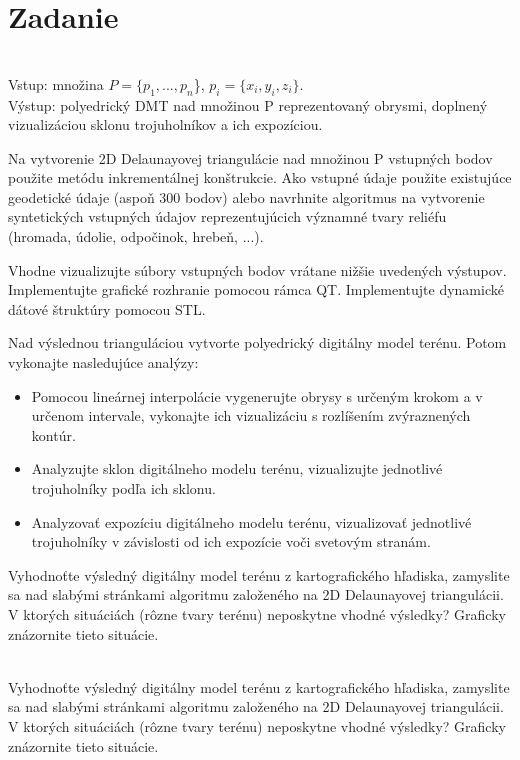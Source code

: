 \documentclass[12pt]{article}
\begin{document}
\section*{Zadanie}\\
\noindent  Vstup: množina $P = \{p_1,..., p_n $\}, $p_i = \{x_i, y_i, z_i\}$. \\
Výstup: polyedrický DMT nad množinou P reprezentovaný obrysmi, doplnený vizualizáciou sklonu trojuholníkov a ich expozíciou.\par
 Na vytvorenie 2D Delaunayovej triangulácie nad množinou P vstupných bodov použite metódu inkrementálnej konštrukcie. Ako vstupné údaje použite existujúce geodetické údaje (aspoň 300 bodov) alebo navrhnite algoritmus na vytvorenie syntetických vstupných údajov reprezentujúcich významné tvary reliéfu (hromada, údolie, odpočinok, hrebeň, ...).\par
Vhodne vizualizujte súbory vstupných bodov vrátane nižšie uvedených výstupov. Implementujte grafické rozhranie pomocou rámca QT. Implementujte dynamické dátové štruktúry pomocou STL.\par
Nad výslednou trianguláciou vytvorte polyedrický digitálny model terénu. Potom vykonajte nasledujúce analýzy:
\begin{itemize}
    \item Pomocou lineárnej interpolácie vygenerujte obrysy s určeným krokom a v určenom intervale, vykonajte
ich vizualizáciu s rozlíšením zvýraznených kontúr.
    \item Analyzujte sklon digitálneho modelu terénu, vizualizujte jednotlivé trojuholníky podľa ich sklonu.
    \item Analyzovať expozíciu digitálneho modelu terénu, vizualizovať jednotlivé trojuholníky v závislosti od ich expozície voči svetovým stranám.
\end{itemize} \par
Vyhodnoťte výsledný digitálny model terénu z kartografického hľadiska, zamyslite sa nad slabými stránkami algoritmu založeného na 2D Delaunayovej triangulácii. V ktorých situáciách (rôzne tvary terénu) neposkytne vhodné výsledky? Graficky znázornite tieto situácie.\\\\\par
Vyhodnoťte výsledný digitálny model terénu z kartografického hľadiska, zamyslite sa nad slabými stránkami algoritmu založeného na 2D Delaunayovej triangulácii. V ktorých situáciách (rôzne tvary terénu) neposkytne vhodné výsledky? Graficky znázornite tieto situácie.\par
\end{document}
